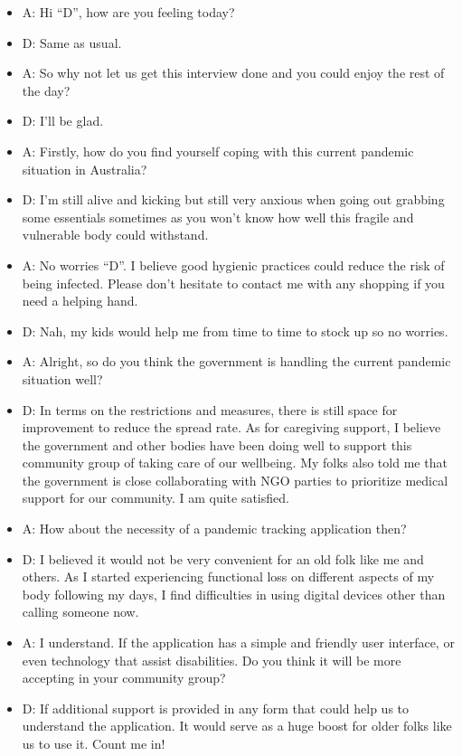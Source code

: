   \begin{itemize}
    \item A: Hi “D”, how are you feeling today?
    \item D: Same as usual.
    \item A: So why not let us get this interview done and you could enjoy the rest of the day?
    \item D: I’ll be glad.
    \item A: Firstly, how do you find yourself coping with this current pandemic situation in Australia?
    \item D: I’m still alive and kicking but still very anxious when going out grabbing some essentials
    sometimes as you won’t know how well this fragile and vulnerable body could withstand.
    \item A: No worries “D”. I believe good hygienic practices could reduce the risk of being infected.
    Please don’t hesitate to contact me with any shopping if you need a helping hand.
    \item D: Nah, my kids would help me from time to time to stock up so no worries.
    \item A: Alright, so do you think the government is handling the current pandemic situation well?
    \item D: In terms on the restrictions and measures, there is still space for improvement to reduce the
    spread rate. As for caregiving support, I believe the government and other bodies have been
    doing well to support this community group of taking care of our wellbeing. My folks also
    told me that the government is close collaborating with NGO parties to prioritize medical
    support for our community. I am quite satisfied.
    \item A: How about the necessity of a pandemic tracking application then?
    \item D: I believed it would not be very convenient for an old folk like me and others. As I started
    experiencing functional loss on different aspects of my body following my days, I find
    difficulties in using digital devices other than calling someone now.
    \item A: I understand. If the application has a simple and friendly user interface, or even technology
    that assist disabilities. Do you think it will be more accepting in your community group?
    \item D: If additional support is provided in any form that could help us to understand the application.
    It would serve as a huge boost for older folks like us to use it. Count me in!

\end{itemize}
